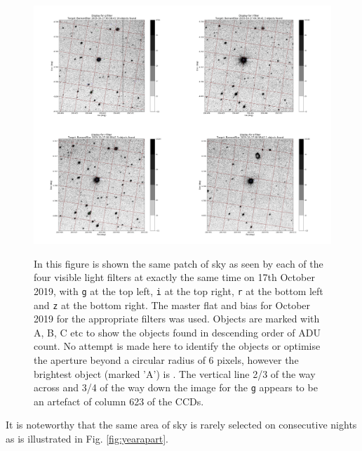 \begin{figure}[!htbp]
\begin{center}
\includegraphics[scale=0.125]{images/exampmontage.png} \\
\end{center}   
\caption{In this figure is shown the same patch of sky as seen by each of the
four visible light filters at exactly the same time on 17th October 2019, with
\texttt{g} at the top left, \texttt{i} at the top right, \texttt{r} at the bottom left and \texttt{z} at the bottom right.
The master flat and bias for October 2019 for the appropriate filters was used.
Objects are marked with A, B, C etc to show
the objects found in descending order of ADU count. No attempt is
made here to identify the objects or optimise the aperture beyond a circular radius of 6 pixels,
however the brightest object (marked 'A') is \bstar.
The vertical line 2/3 of the way across and 3/4 of the way down the image for
the  \texttt{g} appears to be an artefact of column 623 of the CCDs.} 
\protect\label{fig:exampmontage}
\end{figure}

It is noteworthy that the same area of sky is rarely selected on consecutive
nights as is illustrated in Fig. \ref{fig:yearapart}.

